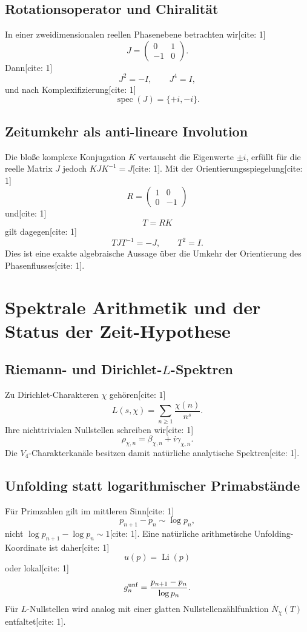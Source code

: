 \documentclass[11pt,a4paper]{article}
\begin{document}
	\subsection{Rotationsoperator und Chiralität}
	In einer zweidimensionalen reellen Phasenebene betrachten wir[cite: 1]
	\[
	J=\begin{pmatrix}0&1\\-1&0\end{pmatrix}.
	\]
	Dann[cite: 1]
	\[
	J^2=-I,\qquad J^4=I,
	\]
	und nach Komplexifizierung[cite: 1]
	\[
	\operatorname{spec}(J)=\{+i,-i\}.
	\]
	
	\subsection{Zeitumkehr als anti-lineare Involution}
	Die bloße komplexe Konjugation $K$ vertauscht die Eigenwerte $\pm i$, erfüllt für die reelle Matrix $J$ jedoch $KJK^{-1}=J$[cite: 1]. Mit der Orientierungsspiegelung[cite: 1]
	\[
	R=\begin{pmatrix}1&0\\0&-1\end{pmatrix}
	\]
	und[cite: 1]
	\[
	T=RK
	\]
	gilt dagegen[cite: 1]
	\[
	\boxed{TJT^{-1}=-J,\qquad T^2=I.}
	\]
	Dies ist eine exakte algebraische Aussage über die Umkehr der Orientierung des Phasenflusses[cite: 1].
	
	\section{Spektrale Arithmetik und der Status der Zeit-Hypothese}
	\subsection{Riemann- und Dirichlet-$L$-Spektren}
	Zu Dirichlet-Charakteren $\chi$ gehören[cite: 1]
	\[
	L(s,\chi)=\sum_{n\ge1}\frac{\chi(n)}{n^s}.
	\]
	Ihre nichttrivialen Nullstellen schreiben wir[cite: 1]
	\[
	\rho_{\chi,n}=\beta_{\chi,n}+i\gamma_{\chi,n}.
	\]
	Die $V_4$-Charakterkanäle besitzen damit natürliche analytische Spektren[cite: 1].
	
	\subsection{Unfolding statt logarithmischer Primabstände}
	Für Primzahlen gilt im mittleren Sinn[cite: 1]
	\[
	p_{n+1}-p_n\sim\log p_n,
	\]
	nicht $\log p_{n+1}-\log p_n\sim1$[cite: 1]. Eine natürliche arithmetische Unfolding-Koordinate ist daher[cite: 1]
	\[
	u(p)=\operatorname{Li}(p)
	\]
	oder lokal[cite: 1]
	\[
	g_n^{\rm unf}=\frac{p_{n+1}-p_n}{\log p_n}.
	\]
	Für $L$-Nullstellen wird analog mit einer glatten Nullstellenzählfunktion $\overline N_\chi(T)$ entfaltet[cite: 1].
	
\end{document}
